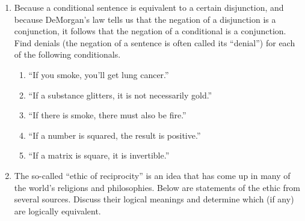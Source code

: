 \begin{enumerate}
\workbookpagebreak

\item Because a conditional sentence is equivalent to a certain disjunction, and 
because DeMorgan's law tells us that the negation of a disjunction is a conjunction,
it follows that the negation of a conditional is a conjunction.  Find denials (the negation
of a sentence is often called its ``denial'') for each of the following conditionals.

\begin{enumerate}
\item ``If you smoke, you'll get lung cancer.''
\item ``If a substance glitters, it is not necessarily gold.''
\item ``If there is smoke, there must also be fire.''
\item ``If a number is squared, the result is positive.''
\item ``If a matrix is square, it is invertible.''
\end{enumerate}

\wbvfill


\hintspagebreak
\workbookpagebreak

\item The so-called ``ethic of reciprocity'' is an idea that has come 
up in many of the world's religions and philosophies.  
Below are statements of the ethic
from several sources.  Discuss their logical meanings and determine which (if 
any) are logically equivalent.


\end{enumerate}

